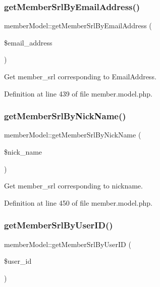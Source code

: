 \subsubsection{\texorpdfstring{get\+Member\+Srl\+By\+Email\+Address()}{getMemberSrlByEmailAddress()}}
{\footnotesize\ttfamily member\+Model\+::get\+Member\+Srl\+By\+Email\+Address (\begin{DoxyParamCaption}\item[{}]{\$email\+\_\+address }\end{DoxyParamCaption})}



Get member\+\_\+srl corresponding to Email\+Address. 



Definition at line 439 of file member.\+model.\+php.

\hypertarget{classmemberModel_af83e783a285b244a510a8dc7662c80cf}{}\label{classmemberModel_af83e783a285b244a510a8dc7662c80cf} 
\subsubsection{\texorpdfstring{get\+Member\+Srl\+By\+Nick\+Name()}{getMemberSrlByNickName()}}
{\footnotesize\ttfamily member\+Model\+::get\+Member\+Srl\+By\+Nick\+Name (\begin{DoxyParamCaption}\item[{}]{\$nick\+\_\+name }\end{DoxyParamCaption})}



Get member\+\_\+srl corresponding to nickname. 



Definition at line 450 of file member.\+model.\+php.

\hypertarget{classmemberModel_a4f548037aabac6d09b42c1a7f81311ee}{}\label{classmemberModel_a4f548037aabac6d09b42c1a7f81311ee} 
\subsubsection{\texorpdfstring{get\+Member\+Srl\+By\+User\+I\+D()}{getMemberSrlByUserID()}}
{\footnotesize\ttfamily member\+Model\+::get\+Member\+Srl\+By\+User\+ID (\begin{DoxyParamCaption}\item[{}]{\$user\+\_\+id }\end{DoxyParamCaption})}



